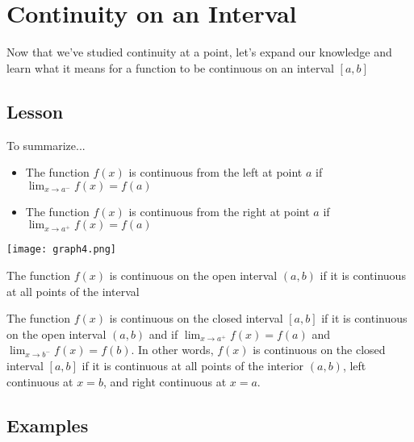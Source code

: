 \documentclass{ximera}
\begin{document}
\section{Continuity on an Interval}

Now that we've studied continuity at a point, let's expand our knowledge and learn what it means for a function to be continuous on an interval $[a,b]$

\subsection{Lesson}
\begin{center}
\end{center}

To summarize...

\begin{explanation}
    \begin{foldable}
        \begin{itemize}
            \item The function $f(x)$ is continuous from the left at point $a$ if $\lim_{x \to a^-} f(x) = f(a)$
            \item The function $f(x)$ is continuous from the right at point $a$ if $\lim_{x \to a^+} f(x) = f(a)$
        \end{itemize}
        \begin{center}            
        \texttt{[image: graph4.png]}
        \end{center}
    \end{foldable}

    \begin{foldable}
        The function $f(x)$ is continuous on the open interval $(a,b)$ if it is continuous at all points of the interval
    \end{foldable}

    \begin{foldable}
        The function $f(x)$ is continuous on the closed interval $[a,b]$ if it is continuous on the open interval $(a,b)$ and if $\lim_{x \to a^+} f(x) = f(a)$ and $\lim_{x \to b^-} f(x) = f(b)$.
        In other words, $f(x)$ is continuous on the closed interval $[a,b]$ if it is continuous at all points of the interior $(a,b)$, left continuous at $x=b$, and right continuous at $x=a$.
    \end{foldable}{}
\end{explanation}

\subsection{Examples}
\end{document}
